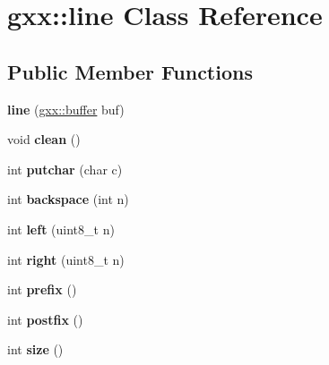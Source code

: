 \hypertarget{classgxx_1_1line}{}\section{gxx\+:\+:line Class Reference}
\label{classgxx_1_1line}
\subsection*{Public Member Functions}
\begin{DoxyCompactItemize}
\item 
{\bfseries line} (\hyperlink{classgxx_1_1buffer}{gxx\+::buffer} buf)\hypertarget{classgxx_1_1line_afe8518288c91bb173cbbd1ca9af71f0d}{}\label{classgxx_1_1line_afe8518288c91bb173cbbd1ca9af71f0d}

\item 
void {\bfseries clean} ()\hypertarget{classgxx_1_1line_ad9e67e21d7e6f2926ea379de0baa9118}{}\label{classgxx_1_1line_ad9e67e21d7e6f2926ea379de0baa9118}

\item 
int {\bfseries putchar} (char c)\hypertarget{classgxx_1_1line_a01723aa33fe071b9fab1a3e92c131632}{}\label{classgxx_1_1line_a01723aa33fe071b9fab1a3e92c131632}

\item 
int {\bfseries backspace} (int n)\hypertarget{classgxx_1_1line_a79a8618d8ed08511b3e8d97adb0379cc}{}\label{classgxx_1_1line_a79a8618d8ed08511b3e8d97adb0379cc}

\item 
int {\bfseries left} (uint8\+\_\+t n)\hypertarget{classgxx_1_1line_abdcc8f6826fb97ae4c19624d6c2cf571}{}\label{classgxx_1_1line_abdcc8f6826fb97ae4c19624d6c2cf571}

\item 
int {\bfseries right} (uint8\+\_\+t n)\hypertarget{classgxx_1_1line_a5abab2b0a958f589b93ec62bf7551963}{}\label{classgxx_1_1line_a5abab2b0a958f589b93ec62bf7551963}

\item 
int {\bfseries prefix} ()\hypertarget{classgxx_1_1line_a706c8f85e8e45c154c5aaeaa9f00014b}{}\label{classgxx_1_1line_a706c8f85e8e45c154c5aaeaa9f00014b}

\item 
int {\bfseries postfix} ()\hypertarget{classgxx_1_1line_aabe7c91419922741155d3091ca195477}{}\label{classgxx_1_1line_aabe7c91419922741155d3091ca195477}

\item 
int {\bfseries size} ()\hypertarget{classgxx_1_1line_a065ed0259923ee5881c637c6f434afc6}{}\label{classgxx_1_1line_a065ed0259923ee5881c637c6f434afc6}


\end{DoxyCompactItemize}
